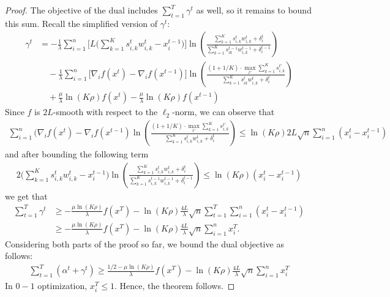 \begin{proof}
\noindent The objective of the dual includes $\sum_{t = 1}^{T} \gamma^{t}$ as well, so it remains to bound this sum. Recall the simplified version of $\gamma^t$:
\begin{align*}
    \gamma^{t} &= -  \frac{1}{\lambda} \sum_{i=1}^{n} \biggl[ L\biggl( \sum_{k=1}^{K} s_{i,k}^{t} w_{i,k}^{t}  - x_{i}^{t-1} \biggr) \biggr]  \ln \left( \frac{\sum_{k=1}^{K} s_{i,k}^{t} w_{i,k}^{t} + \delta_{i}^{t}}{\sum_{k=1}^{K}  s_{ik}^{t-1}w_{i,k}^{t-1}  + \delta_{i}^{t-1}} \right) \\
    	& \quad - \frac{1}{\lambda} \sum_{i=1}^{n} \biggl[ \nabla_{i} f(x^{t}) - \nabla_{i} f(x^{t-1}) \biggr] \ln \left( \frac{(1 + 1/K) \cdot \max_{t'} \sum_{k=1}^{K} s_{i,k}^{t'}}{\sum_{k=1}^{K}  s_{ik}^{t}w_{i,k}^{t}  + \delta_{i}^{t}} \right)  \\
	& \quad + \frac{\mu}{\lambda} \ln(K\rho) f(x^{t}) - \frac{\mu}{\lambda} \ln(K\rho) f(x^{t-1})
\end{align*}
%
Since $f$ is $2L$-smooth with respect to the $\ell_{2}$-norm, we can observe that
\begin{align*}
\sum_{i=1}^{n} (\nabla_{i} f(x^{t}) -  \nabla_{i} f(x^{t-1}) \ln \left( \frac{(1 + 1/K) \cdot \max_{t'} \sum_{k=1}^{K} s_{i,k}^{t'}}{\sum_{k=1}^{K}  s_{i,k}^{t}w_{i,k}^{t}  + \delta_{i}^{t}} \right)
\leq \ln(K\rho) 2L\sqrt{n} \sum_{i=1}^{n} (x_{i}^{t} - x_{i}^{t-1})
\end{align*}
%
and after bounding the following term
%
\begin{align*}
2\biggl( \sum_{k=1}^{K} s_{i,k}^{t} w_{i,k}^{t}  - x_{i}^{t-1} \biggr) \ln \left( \frac{\sum_{k=1}^{K} s_{i,k}^{t} w_{i,k}^{t} + \delta_{i}^{t}}{\sum_{k=1}^{K}  s_{i,k}^{t-1}w_{i,k}^{t-1}  + \delta_{i}^{t-1}} \right)
\leq \ln(K\rho) (x_{i}^{t} - x_{i}^{t-1})
\end{align*}
%
we get that
\begin{align*}
\sum_{t=1}^{T} \gamma^{t} &\geq - \frac{\mu \ln (K\rho)}{\lambda} f(x^{T}) - \ln(K\rho) \frac{4L}{\lambda} \sqrt{n} \sum_{t=1}^{T} \sum_{i=1}^{n} (x_{i}^{t} - x_{i}^{t-1}) \\
&\geq - \frac{\mu \ln (K\rho)}{\lambda} f(x^{T}) - \ln(K\rho) \frac{4L}{\lambda} \sqrt{n} \sum_{i=1}^{n} x_{i}^{T}.
\end{align*}
Considering both parts of the proof so far, we bound the dual objective as follows:
\begin{align*}
\sum_{t=1}^{T} (\alpha^{t} + \gamma^{t}) \geq \frac{1/2-\mu\ln (K\rho)}{\lambda} f(x^{T}) - \ln(K\rho) \frac{4L}{\lambda} \sqrt{n} \sum_{i=1}^{n} x_{i}^{T}
\end{align*}
In $0-1$ optimization, $x_{i}^{T} \leq 1$.
Hence, the theorem follows.
\end{proof}
